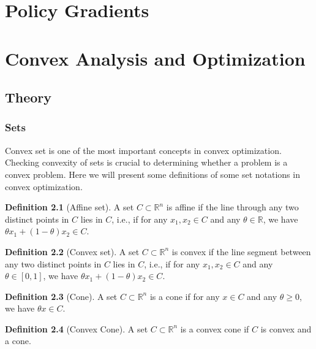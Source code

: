 \documentclass[
]{book}
\theoremstyle{definition}
\newtheorem{definition}{Definition}[chapter]
\theoremstyle{definition}
\theoremstyle{definition}
\theoremstyle{definition}
\theoremstyle{remark}
\begin{document}
\chapter{Policy Gradients}\label{policy-gradient}

\appendix


\chapter{Convex Analysis and Optimization}\label{appconvex}

\section{Theory}\label{appconvex-theory}

\subsection{Sets}\label{sets}

Convex set is one of the most important concepts in convex optimization. Checking convexity of sets is crucial to determining whether a problem is a convex problem. Here we will present some definitions of some set notations in convex optimization.

\begin{definition}[Affine set]
\protect\hypertarget{def:affineset}{}\label{def:affineset}A set \(C\subset \mathbb{R}^n\) is affine if the line through any two distinct points in \(C\) lies in \(C\), i.e., if for any \(x_1,x_2 \in C\) and any \(\theta \in \mathbb{R}\), we have \(\theta x_1 + (1-\theta)x_2 \in C\).
\end{definition}

\begin{definition}[Convex set]
\protect\hypertarget{def:convexset}{}\label{def:convexset}A set \(C\subset \mathbb{R}^n\) is convex if the line segment between any two distinct points in \(C\) lies in \(C\), i.e., if for any \(x_1,x_2 \in C\) and any \(\theta \in [0,1]\), we have \(\theta x_1 + (1-\theta)x_2 \in C\).
\end{definition}

\begin{definition}[Cone]
\protect\hypertarget{def:cone}{}\label{def:cone}A set \(C\subset \mathbb{R}^n\) is a cone if for any \(x\in C\) and any \(\theta\geq 0\), we have \(\theta x \in C\).
\end{definition}

\begin{definition}[Convex Cone]
\protect\hypertarget{def:convexcone}{}\label{def:convexcone}A set \(C\subset \mathbb{R}^n\) is a convex cone if \(C\) is convex and a cone.
\end{definition}
\end{document}
